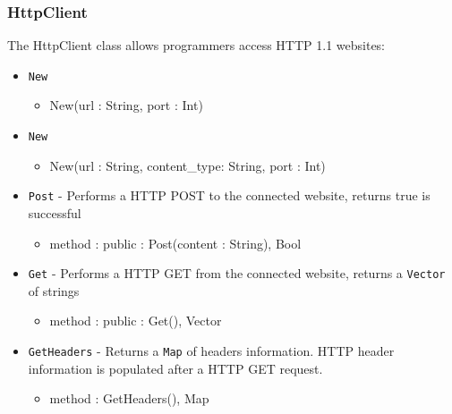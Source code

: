\documentclass[12pt]{article}
\begin{document}
\subsubsection{HttpClient}
The HttpClient class allows programmers access HTTP 1.1 websites:
\begin{itemize}
    \item \texttt{New}
    	\begin{itemize}
	\item New(url : String, port : Int)
	\end{itemize}
    \item \texttt{New}
    	\begin{itemize}
	\item New(url : String, content\_type: String, port : Int)
	\end{itemize}
    \item \texttt{Post} - Performs a HTTP POST to the connected website, returns true is successful
    	\begin{itemize}
	\item method : public : Post(content : String), Bool
	\end{itemize}
    \item \texttt{Get} - Performs a HTTP GET from the connected website, returns a \texttt{Vector} of strings
    	\begin{itemize}
	\item method : public : Get(), Vector
	\end{itemize}
    \item \texttt{GetHeaders} - Returns a \texttt{Map} of headers information.  HTTP header information is populated after a HTTP GET request.
    	\begin{itemize}
	\item method : GetHeaders(), Map
	\end{itemize}
\end{itemize}
\end{document}
